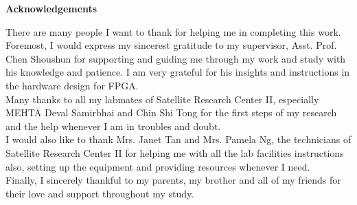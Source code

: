 \begin{center}
\textbf{\large Acknowledgements}
\end{center}


\noindent There are many people I want to thank for helping me in completing this work. Foremost, I would express my sincerest gratitude to my supervisor, Asst. Prof. Chen Shoushun for supporting and guiding me through my work and study with his knowledge and patience. I am very grateful for his insights and instructions in the hardware design for FPGA. \\

\noindent Many thanks to all my labmates of Satellite Research Center II, especially MEHTA Deval Samirbhai and Chin Shi Tong for the first steps of my research and the help whenever I am in troubles and doubt. \\

\noindent I would also like to thank Mrs. Janet Tan and Mrs. Pamela Ng, the technicians of Satellite Research Center II for helping me with all the lab facilities instructions also, setting up the equipment and providing resources whenever I need. \\

\noindent Finally, I sincerely thankful to my parents, my brother and all of my friends for their love and support throughout my study.

\vspace{1cm}

\hfill
